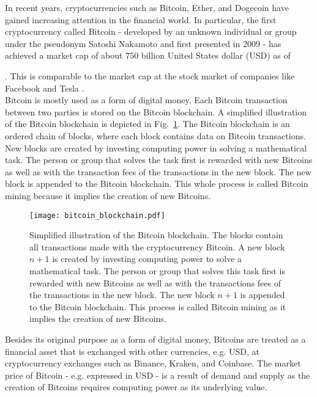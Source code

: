 In recent years, cryptocurrencies such as Bitcoin, Ether, and Dogecoin have gained increasing attention in the financial world. In particular, the first cryptocurrency called Bitcoin - developed by an unknown individual or group under the pseudonym Satoshi Nakamoto and first presented in 2009 \cite{Bitcoin2009} - has achieved a market cap of about $750$ billion United States dollar (USD) as of \date{14 June 2021}. This is comparable to the market cap at the stock market of companies like Facebook and Tesla \cite{MarketCapCompany2021}\cite{MarketCapBitcoin2021}.\\

Bitcoin is mostly used as a form of digital money. Each Bitcoin transaction between two parties is stored on the Bitcoin blockchain. A simplified illustration of the Bitcoin blockchain is depicted in Fig.~\ref{fig:blockchain}. The Bitcoin blockchain is an ordered chain of blocks, where each block contains data on Bitcoin transactions. New blocks are created by investing computing power in solving a mathematical task. The person or group that solves the task first is rewarded with new Bitcoins as well as with the transaction fees of the transactions in the new block. The new block is appended to the Bitcoin blockchain. This whole process is called Bitcoin mining because it implies the creation of new Bitcoins.

\begin{figure}[h]
  \centering
  \texttt{[image: bitcoin\_blockchain.pdf]}
  \caption{Simplified illustration of the Bitcoin blockchain. The blocks contain all transactions made with the cryptocurrency Bitcoin. A new block $n+1$ is created by investing computing power to solve a mathematical task. The person or group that solves this task first is rewarded with new Bitcoins as well as with the transactions fees of the transactions in the new block. The new block $n+1$ is appended to the Bitcoin blockchain. This process is called Bitcoin mining as it implies the creation of new Bitcoins.}
  \label{fig:blockchain}
\end{figure}

Besides its original purpose as a form of digital money, Bitcoins are treated as a financial asset that is exchanged with other currencies, e.g. USD, at cryptocurrency exchanges such as Binance, Kraken, and Coinbase. The market price of Bitcoin - e.g. expressed in USD - is a result of demand and supply as the creation of Bitcoins requires computing power as its underlying value. \\

